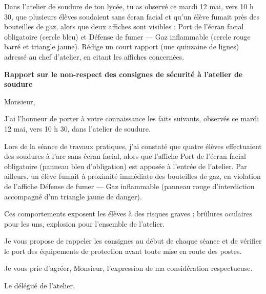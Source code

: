 \documentclass[11pt]{article}
\begin{document}
\begin{exercice}
Dans l'atelier de soudure de ton lycée, tu as observé ce mardi 12 mai, vers 10 h 30, que plusieurs élèves soudaient sans écran facial et qu'un élève fumait près des bouteilles de gaz, alors que deux affiches sont visibles : \og Port de l'écran facial obligatoire \fg{} (cercle bleu) et \og Défense de fumer — Gaz inflammable \fg{} (cercle rouge barré et triangle jaune). Rédige un court rapport (une quinzaine de lignes) adressé au chef d'atelier, en citant les affiches concernées.
\end{exercice}

\begin{corrige}
\textbf{Rapport sur le non-respect des consignes de sécurité à l'atelier de soudure}

Monsieur,

J'ai l'honneur de porter à votre connaissance les faits suivants, observés ce mardi 12 mai, vers 10 h 30, dans l'atelier de soudure.

Lors de la séance de travaux pratiques, j'ai constaté que quatre élèves effectuaient des soudures à l'arc sans écran facial, alors que l'affiche \og Port de l'écran facial obligatoire \fg{} (panneau bleu d'obligation) est apposée à l'entrée de l'atelier. Par ailleurs, un élève fumait à proximité immédiate des bouteilles de gaz, en violation de l'affiche \og Défense de fumer — Gaz inflammable \fg{} (panneau rouge d'interdiction accompagné d'un triangle jaune de danger).

Ces comportements exposent les élèves à des risques graves : brûlures oculaires pour les uns, explosion pour l'ensemble de l'atelier.

Je vous propose de rappeler les consignes au début de chaque séance et de vérifier le port des équipements de protection avant toute mise en route des postes.

Je vous prie d'agréer, Monsieur, l'expression de ma considération respectueuse.

Le délégué de l'atelier.
\end{corrige}
\end{document}
